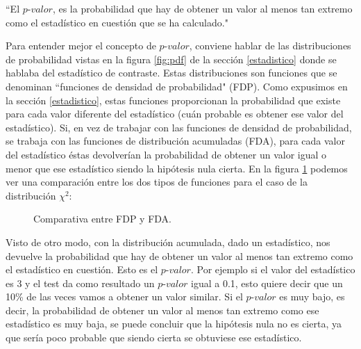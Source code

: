 \begin{center}
``El $\textit{p-valor}$, es la probabilidad que hay de obtener un valor al menos tan extremo como el estadístico en cuestión
que se ha calculado."
\end{center}

Para entender mejor el concepto de $\textit{p-valor}$, conviene hablar de las distribuciones de probabilidad vistas en la
figura \ref{fig:pdf} de la sección \ref{estadistico} donde se hablaba del estadístico de contraste. Estas
distribuciones son funciones que se denominan ``funciones de densidad de probabilidad" (FDP). Como expusimos en
la sección \ref{estadistico}, estas funciones proporcionan la probabilidad que existe para cada valor
diferente del estadístico (cuán probable es obtener ese valor del estadístico). Si, en vez de trabajar con las
funciones de densidad de probabilidad, se trabaja con las funciones de distribución acumuladas (FDA), para cada
valor del estadístico éstas devolverían la probabilidad de obtener un valor igual o menor que ese estadístico siendo
la hipótesis nula cierta. En la figura \ref{fig:comparativa_pdf_cdf} podemos ver una comparación entre los dos
tipos de funciones para el caso de la distribución $\chi^2$:

\begin{figure}[h]
\centering
{}
\caption{Comparativa entre FDP y FDA.}
\label{fig:comparativa_pdf_cdf}
\end{figure}

Visto de otro modo, con la distribución acumulada, dado un estadístico, nos devuelve la probabilidad que hay de
obtener un valor al menos tan extremo como el estadístico en cuestión. Esto es el \textbf{$\textit{p-valor}$}. Por ejemplo si
el valor del estadístico es 3 y el test da como resultado un $\textit{p-valor}$ igual a 0.1, esto quiere decir que un 10\% de
las veces vamos a obtener un valor similar. Si el $\textit{p-valor}$ es muy bajo, es decir, la probabilidad de obtener un valor
al menos tan extremo como ese estadístico es muy baja, se puede concluir que la hipótesis nula no es cierta, ya que
sería poco probable que siendo cierta se obtuviese ese estadístico.

